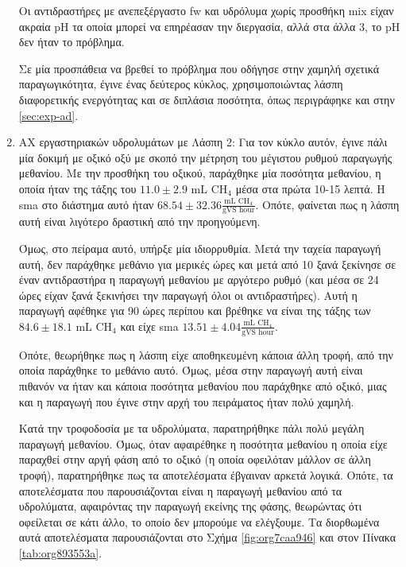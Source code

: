 \documentclass[11pt]{report}
\begin{document}
\begin{enumerate}
Οι αντιδραστήρες με ανεπεξέργαστο \acrshort{fw} και υδρόλυμα χωρίς προσθήκη \acrshort{mix} είχαν ακραία pH τα οποία μπορεί να επηρέασαν την διεργασία, αλλά στα άλλα 3, το pH δεν ήταν το πρόβλημα.

Σε μία προσπάθεια να βρεθεί το πρόβλημα που οδήγησε στην χαμηλή σχετικά παραγωγικότητα, έγινε ένας δεύτερος κύκλος, χρησιμοποιώντας λάσπη διαφορετικής ενεργότητας και σε διπλάσια ποσότητα, όπως περιγράφηκε και στην \autoref{sec:exp-ad}.

\item ΑΧ εργαστηριακών υδρολυμάτων με Λάσπη 2:
\label{sec:org8925145}
Για τον κύκλο αυτόν, έγινε πάλι μία δοκιμή με οξικό οξύ με σκοπό την μέτρηση του μέγιστου ρυθμού παραγωγής μεθανίου. Με την προσθήκη του οξικού, παράχθηκε μία ποσότητα μεθανίου, η οποία ήταν της τάξης του \(11.0 \pm 2.9 \text{ mL CH$_4$}\) μέσα στα πρώτα 10-15 λεπτά. H \acrshort{sma} στο διάστημα αυτό ήταν \(68.54 \pm 32.36 \frac{\text{mL CH$_4$}}{\text{gVS hour}}\). Οπότε, φαίνεται πως η λάσπη αυτή είναι λιγότερο δραστική από την προηγούμενη.

Όμως, στο πείραμα αυτό, υπήρξε μία ιδιορρυθμία. Μετά την ταχεία παραγωγή αυτή, δεν παράχθηκε μεθάνιο για μερικές ώρες και μετά από 10 ξανά ξεκίνησε σε έναν αντιδραστήρα η παραγωγή μεθανίου με αργότερο ρυθμό (και μέσα σε 24 ώρες είχαν ξανά ξεκινήσει την παραγωγή όλοι οι αντιδραστήρες). Αυτή η παραγωγή αφέθηκε για 90 ώρες περίπου και βρέθηκε να είναι της τάξης των \(84.6 \pm 18.1 \text{ mL CH$_4$}\) και είχε \acrshort{sma} \(13.51 \pm 4.04 \frac{\text{mL CH$_4$}}{\text{gVS hour}}\).

Οπότε, θεωρήθηκε πως η λάσπη είχε αποθηκευμένη κάποια άλλη τροφή, από την οποία παράχθηκε το μεθάνιο αυτό. Όμως, μέσα στην παραγωγή αυτή είναι πιθανόν να ήταν και κάποια ποσότητα μεθανίου που παράχθηκε από οξικό, μιας και η παραγωγή που έγινε στην αρχή του πειράματος ήταν πολύ χαμηλή.

Κατά την τροφοδοσία με τα υδρολύματα, παρατηρήθηκε πάλι πολύ μεγάλη παραγωγή μεθανίου. Όμως, όταν αφαιρέθηκε η ποσότητα μεθανίου η οποία είχε παραχθεί στην αργή φάση από το οξικό (η οποία οφειλόταν μάλλον σε άλλη τροφή), παρατηρήθηκε πως τα αποτελέσματα έβγαιναν αρκετά λογικά. Οπότε, τα αποτελέσματα που παρουσιάζονται είναι η παραγωγή μεθανίου από τα υδρολύματα, αφαιρόντας την παραγωγή εκείνης της φάσης, θεωρώντας ότι οφείλεται σε κάτι άλλο, το οποίο δεν μπορούμε να ελέγξουμε. Τα διορθωμένα αυτά αποτελέσματα παρουσιάζονται στο Σχήμα \ref{fig:org7caa946} και στον Πίνακα \ref{tab:org893553a}.


\end{enumerate}
\end{document}
